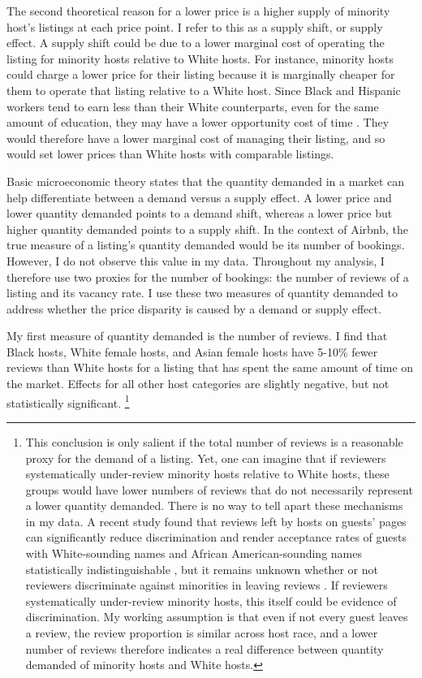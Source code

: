 The second theoretical reason for a lower price is a higher supply of minority host's listings at each price point. I refer to this as a supply shift, or supply effect. A supply shift could be due to a lower marginal cost of operating the listing for minority hosts relative to White hosts. For instance, minority hosts could charge a lower price for their listing because it is marginally cheaper for them to operate that listing relative to a White host. Since Black and Hispanic workers tend to earn less than their White counterparts, even for the same amount of education, they may have a lower opportunity cost of time \citep{wages}. They would therefore have a lower marginal cost of managing their listing, and so would set lower prices than White hosts with comparable listings.  

Basic microeconomic theory states that the quantity demanded in a market can help differentiate between a demand versus a supply effect. A lower price and lower quantity demanded points to a demand shift, whereas a lower price but higher quantity demanded points to a supply shift. In the context of Airbnb, the true measure of a listing's quantity demanded would be its number of bookings. However, I do not observe this value in my data. Throughout my analysis, I therefore use two proxies for the number of bookings: the number of reviews of a listing and its vacancy rate. I use these two measures of quantity demanded to address whether the price disparity is caused by a demand or supply effect.  

My first measure of quantity demanded is the number of reviews. I find that Black hosts, White female hosts, and Asian female hosts have 5-10\% fewer reviews than White hosts for a listing that has spent the same amount of time on the market. Effects for all other host categories are slightly negative, but not statistically significant.%
	\footnote{This conclusion is only salient if the total number of reviews is a reasonable proxy for the demand of a listing. Yet, one can imagine that if reviewers systematically under-review minority hosts relative to White hosts, these groups would have lower numbers of reviews that do not necessarily represent a lower quantity demanded. There is no way to tell apart these mechanisms in my data. A recent study found that reviews left by hosts on guests’ pages can significantly reduce discrimination and render acceptance rates of guests with White-sounding names and African American-sounding names statistically indistinguishable \citep{cui}, but it remains unknown whether or not reviewers discriminate against minorities in leaving reviews \citep{ye}. If reviewers systematically under-review minority hosts, this itself could be evidence of discrimination. My working assumption is that even if not every guest leaves a review, the review proportion is similar across host race, and a lower number of reviews therefore indicates a real difference between quantity demanded of minority hosts and White hosts.}

